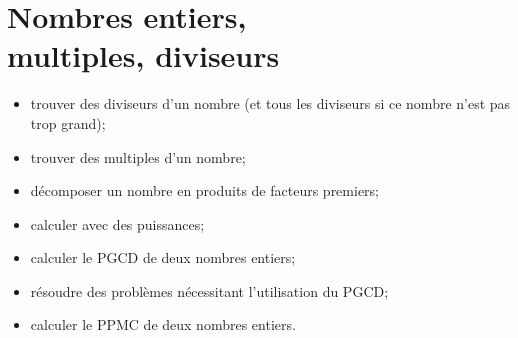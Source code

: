 \chapter{Nombres entiers, \\ multiples, diviseurs}\label{ChNbEntiersMultDiv}
\begin{acquis} %
\begin{itemize}
\item trouver des diviseurs d'un nombre (et tous les diviseurs si ce nombre n'est pas trop grand);
\item trouver des multiples d'un nombre; 
\item décomposer un nombre en produits de facteurs premiers;
\item calculer avec des puissances;
\item calculer le PGCD de deux nombres entiers;
\item résoudre des problèmes nécessitant l'utilisation du PGCD;
\item calculer le PPMC de deux nombres entiers.
\end{itemize}
\end{acquis}

\activites



\cours


\exercicesbase
\begin{colonne*exercice}

\end{colonne*exercice}


\exercicesappr
\begin{colonne*exercice}

\end{colonne*exercice}

\connaissances


\TravauxPratiques %


\pagebreak

\recreation



